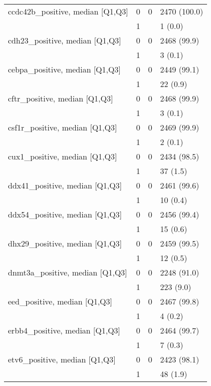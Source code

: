 \begin{tabular}{llll}
ccdc42b\_positive, median [Q1,Q3] & 0 &      0 &      2470 (100.0) \\
                 & 1 &        &           1 (0.0) \\
cdh23\_positive, median [Q1,Q3] & 0 &      0 &       2468 (99.9) \\
                 & 1 &        &           3 (0.1) \\
cebpa\_positive, median [Q1,Q3] & 0 &      0 &       2449 (99.1) \\
                 & 1 &        &          22 (0.9) \\
cftr\_positive, median [Q1,Q3] & 0 &      0 &       2468 (99.9) \\
                 & 1 &        &           3 (0.1) \\
csf1r\_positive, median [Q1,Q3] & 0 &      0 &       2469 (99.9) \\
                 & 1 &        &           2 (0.1) \\
cux1\_positive, median [Q1,Q3] & 0 &      0 &       2434 (98.5) \\
                 & 1 &        &          37 (1.5) \\
ddx41\_positive, median [Q1,Q3] & 0 &      0 &       2461 (99.6) \\
                 & 1 &        &          10 (0.4) \\
ddx54\_positive, median [Q1,Q3] & 0 &      0 &       2456 (99.4) \\
                 & 1 &        &          15 (0.6) \\
dhx29\_positive, median [Q1,Q3] & 0 &      0 &       2459 (99.5) \\
                 & 1 &        &          12 (0.5) \\
dnmt3a\_positive, median [Q1,Q3] & 0 &      0 &       2248 (91.0) \\
                 & 1 &        &         223 (9.0) \\
eed\_positive, median [Q1,Q3] & 0 &      0 &       2467 (99.8) \\
                 & 1 &        &           4 (0.2) \\
erbb4\_positive, median [Q1,Q3] & 0 &      0 &       2464 (99.7) \\
                 & 1 &        &           7 (0.3) \\
etv6\_positive, median [Q1,Q3] & 0 &      0 &       2423 (98.1) \\
                 & 1 &        &          48 (1.9) \\

\end{tabular}
